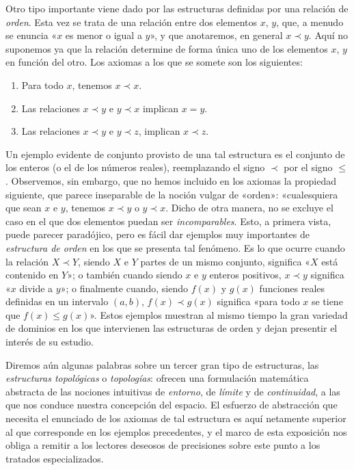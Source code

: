 \documentclass[a4paper, 12pt, draft]{article}
\begin{document}
Otro tipo importante viene dado por las estructuras definidas por una relación de \textit{orden}. Esta vez se trata de una relación entre dos elementos $x$, $y$, que, a menudo se enuncia «$x$ es menor o igual a $y$», y que anotaremos, en general $ x \prec y$. Aquí no suponemos ya que la relación determine de forma única uno de los elementos $x$, $y$ en función del otro. Los axiomas a los que se somete son los siguientes: 

\begin{enumerate}[\indent a)]
\vspace{- 1em}

\item Para todo $x$, tenemos $x \prec x$.

\item Las relaciones $x \prec y$ e $y \prec x$ implican $x=y$.

\item Las relaciones $x\prec y$ e $y\prec z$, implican $x\prec z$. 

 \end{enumerate}

 Un ejemplo evidente de conjunto provisto de una tal estructura es el conjunto de los enteros (o el de los números reales), reemplazando el signo $\prec$ por el signo $\le $. Observemos, sin embargo, que no hemos incluido en los axiomas la propiedad siguiente, que parece inseparable de la noción vulgar de «orden»: «cualesquiera que sean $x$ e $y$, tenemos $ x \prec y$ o $y \prec x$. Dicho de otra manera, no se excluye el caso en el que dos elementos puedan ser \textit{incomparables}. Esto, a primera vista, puede parecer paradójico, pero es fácil dar ejemplos muy importantes de \textit{estructura de orden} en los que se presenta tal fenómeno. Es lo que ocurre cuando la relación $ X \prec Y$, siendo $X$ e $Y$ partes de un mismo conjunto, significa «$X$ está contenido en $Y$»; o también cuando siendo $x$ e $y$ enteros positivos, $x \prec y$ significa «$x$ divide a $y$»; o finalmente cuando, siendo $f(x)$ y $g(x)$ funciones reales definidas en un intervalo $(a,b)$, $f(x)\prec g(x)$ significa «para todo $x$ se tiene que $f(x) \le g(x)$». Estos ejemplos muestran al mismo tiempo la gran variedad de dominios en los que intervienen las estructuras de orden y dejan presentir el interés de su estudio.

Diremos aún algunas palabras sobre un tercer gran tipo de estructuras, las \textit{estructuras topológicas} o \textit{topologías}: ofrecen una formulación matemática abstracta de las nociones intuitivas de \textit{entorno}, de \textit{límite} y de \textit{continuidad}, a las que nos conduce nuestra concepción del espacio. El esfuerzo de abstracción que necesita el enunciado de los axiomas de tal estructura es aquí netamente superior al que corresponde en los ejemplos precedentes, y el marco de esta exposición nos obliga a remitir a los lectores deseosos de precisiones sobre este punto a los tratados especializados.
\end{document}
